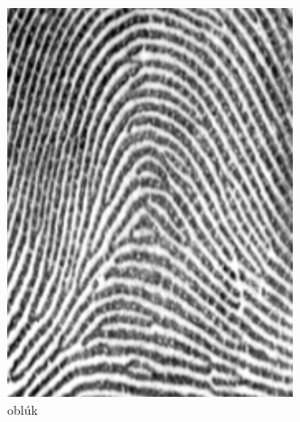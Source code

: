   \begin{figure}[h]\centering
    \centering
    \begin{subfigure}[b]{0.19\linewidth}
      \includegraphics[width=\linewidth]{obrazky-figures/obluk.png}
      \caption{oblúk}
      \label{obr:triedy_odtlackov/obluk}
    \end{subfigure}
    \hfill
    \begin{subfigure}[b]{0.19\linewidth}

\end{subfigure}
\end{figure}
